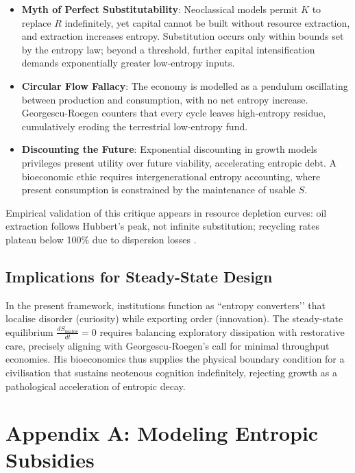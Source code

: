 \documentclass[12pt,a4paper]{article}
\begin{document}
\begin{itemize}
\item \textbf{Myth of Perfect Substitutability}: Neoclassical models permit \(K\) to replace \(R\) indefinitely, 
yet capital cannot be built without resource extraction, and extraction increases entropy. 
Substitution occurs only within bounds set by the entropy law; 
beyond a threshold, further capital intensification demands exponentially greater low-entropy inputs.
\item \textbf{Circular Flow Fallacy}: The economy is modelled as a pendulum oscillating between production and consumption, 
with no net entropy increase. Georgescu-Roegen counters that every cycle leaves high-entropy residue, 
cumulatively eroding the terrestrial low-entropy fund.
\item \textbf{Discounting the Future}: Exponential discounting in growth models 
privileges present utility over future viability, 
accelerating entropic debt. A bioeconomic ethic requires intergenerational entropy accounting, 
where present consumption is constrained by the maintenance of usable \(S\).
\end{itemize}

Empirical validation of this critique appears in resource depletion curves: 
oil extraction follows Hubbert’s peak, not infinite substitution; 
recycling rates plateau below 100\% due to dispersion losses \citep{georgescu1975energy}.

\subsection{Implications for Steady-State Design}

In the present framework, institutions function as ``entropy converters’’ 
that localise disorder (curiosity) while exporting order (innovation). 
The steady-state equilibrium \(\frac{dS_{\text{usable}}}{dt} = 0\) 
requires balancing exploratory dissipation with restorative care, 
precisely aligning with Georgescu-Roegen’s call for minimal throughput economies. 
His bioeconomics thus supplies the physical boundary condition 
for a civilisation that sustains neotenous cognition indefinitely, 
rejecting growth as a pathological acceleration of entropic decay.

\appendix

\section{Appendix A: Modeling Entropic Subsidies}
\end{document}
